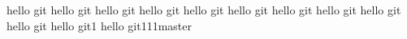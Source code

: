 hello git
hello git
hello git
hello git
hello git
hello git
hello git
hello git
hello git
hello git
hello git1
hello git111master
